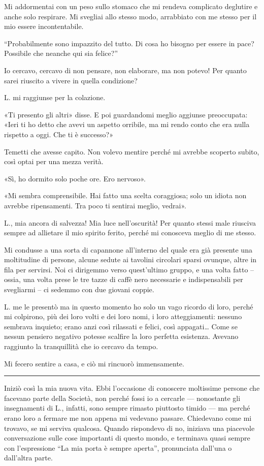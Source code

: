 \documentclass[a4paper,10pt]{memoir}
\begin{document}
Mi addormentai con un peso sullo stomaco che mi rendeva complicato deglutire e anche solo respirare. Mi svegliai allo
stesso modo, arrabbiato con me stesso per il mio essere incontentabile.

``Probabilmente sono impazzito del tutto. Di cosa ho bisogno per essere in pace? Possibile che neanche qui sia felice?''

Io cercavo, cercavo di non pensare, non elaborare, ma non potevo! Per quanto sarei riuscito a vivere in quella
condizione?

L. mi raggiunse per la colazione.

«Ti presento gli altri» disse. E poi guardandomi meglio aggiunse preoccupata: «Ieri ti ho detto che avevi un aspetto
orribile, ma mi rendo conto che era nulla rispetto a oggi. Che ti è successo?»

Temetti che avesse capito. Non volevo mentire perché mi avrebbe scoperto subito, così optai per una mezza verità.

«Sì, ho dormito solo poche ore. Ero nervoso».

«Mi sembra comprensibile. Hai fatto una scelta coraggiosa; solo un idiota non avrebbe ripensamenti. Tra poco ti sentirai
meglio, vedrai».

L., mia ancora di salvezza! Mia luce nell'oscurità! Per quanto stessi male riusciva sempre ad allietare il mio spirito
ferito, perché mi conosceva meglio di me stesso.

Mi condusse a una sorta di capannone all'interno del quale era già presente una moltitudine di persone, alcune sedute ai
tavolini circolari sparsi ovunque, altre in fila per servirsi. Noi ci dirigemmo verso quest'ultimo gruppo, e una volta
fatto -- ossia, una volta prese le tre tazze di caffè nero necessarie e indispensabili per svegliarmi -- ci sedemmo con
due giovani coppie.

L. me le presentò ma in questo momento ho solo un vago ricordo di loro, perché mi colpirono, più dei loro volti e dei
loro nomi, i loro atteggiamenti: nessuno sembrava inquieto; erano anzi così rilassati e felici, così appagati\dots{}
Come se nessun pensiero negativo potesse scalfire la loro perfetta esistenza. Avevano raggiunto la tranquillità che io
cercavo da tempo.

Mi fecero sentire a casa, e ciò mi rincuorò immensamente.

\plainbreak{1}

Iniziò così la mia nuova vita. Ebbi l'occasione di conoscere moltissime persone che facevano parte della Società, non
perché fossi io a cercarle --- nonostante gli insegnamenti di L., infatti, sono sempre rimasto piuttosto timido --- ma
perché erano loro a fermare me non appena mi vedevano passare. Chiedevano come mi trovavo, se mi serviva qualcosa.
Quando rispondevo di no, iniziava una piacevole conversazione sulle cose importanti di questo mondo, e terminava quasi
sempre con l'espressione ``La mia porta è sempre aperta'', pronunciata dall'una o dall'altra parte.
\end{document}
